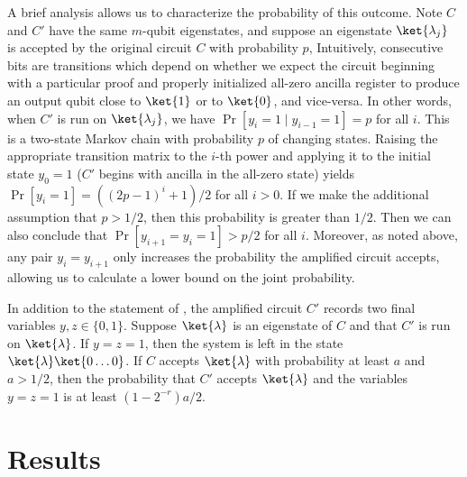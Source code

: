 \documentclass{toc}
\begin{document}
A brief analysis allows us to characterize the probability of this outcome.
Note $C$ and $C'$ have the same $m$-qubit eigenstates,
and suppose an eigenstate $\ket{\lambda_j}$ is accepted by the
original circuit $C$ with probability $p$,
Intuitively, consecutive bits are transitions which depend on whether we expect
the circuit beginning with a particular proof and properly initialized all-zero ancilla register to produce an output qubit close to $\ket{1}$ or to $\ket{0}$, and vice-versa.
In other words, when $C'$ is run on $\ket{\lambda_j}$,
we have $\Pr\left[y_{i}=1 \mid y_{i-1}=1\right] = p$ for all $i$.
This is a two-state Markov chain
with probability $p$ of changing states.
Raising the appropriate transition matrix to the $i$-th power
and applying it to the initial state $y_0=1$ ($C'$ begins with ancilla in the all-zero state) 
yields $\Pr\left[y_i=1\right] = \left(\left(2p-1\right)^i + 1\right)/2$ for all $i>0$.
If we make the additional assumption that $p>1/2$, then this probability is greater than $1/2$.
Then we can also conclude that $\Pr\left[y_{i+1}=y_i=1\right] > p/2$ for all $i$.
Moreover, as noted above,
any pair $y_{i}=y_{i+1}$ only increases the probability the amplified circuit accepts, allowing us to %
calculate a lower bound on the joint probability. %


\begin{lemma}\label{lem:MW2}
	In addition to the statement of ,
	the amplified circuit
	$C'$ records two final variables $y,z\in \{0,1\}$.
	Suppose $\ket{\lambda}$ is an eigenstate of $C$
	and that
	$C'$ is run on $\ket{\lambda}$.
	If
	$y=z=1$,
	then the system is left in the state $\ket{\lambda}\ket{0\dots 0}$.
	If $C$ accepts $\ket{\lambda}$ with probability at least $a$ and $a > 1/2$,
	then the probability that $C'$ accepts $\ket{\lambda}$ and the variables $y=z=1$ is at least $\left(1-2^{-r}\right) a /2$.
\end{lemma}


%
\section{Results}
\end{document}

